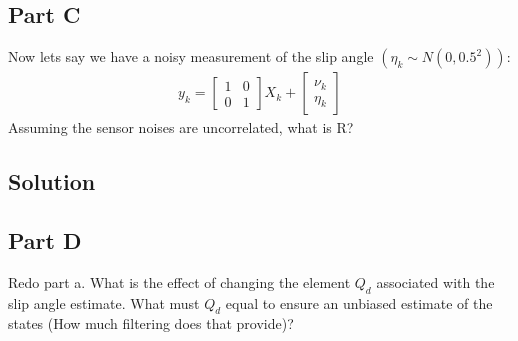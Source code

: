 \documentclass{article}
\begin{document}
\subsection*{Part C}
Now lets say we have a noisy measurement of the slip angle $(\eta_k\sim N(0,0.5^2))$:
\begin{gather}
    y_k = \begin{bmatrix}
        1 & 0 \\
        0 & 1
    \end{bmatrix}X_k + \begin{bmatrix}
        \nu_k \\
        \eta_k
    \end{bmatrix}
\end{gather}
Assuming the sensor noises are uncorrelated, what is R?
\subsection*{Solution}

\subsection*{Part D}
Redo part a.  What is the effect of changing the element $Q_d$ associated with the slip angle estimate.  What must $Q_d$ equal to ensure an unbiased estimate of the states (How much filtering does that provide)?
\end{document}

